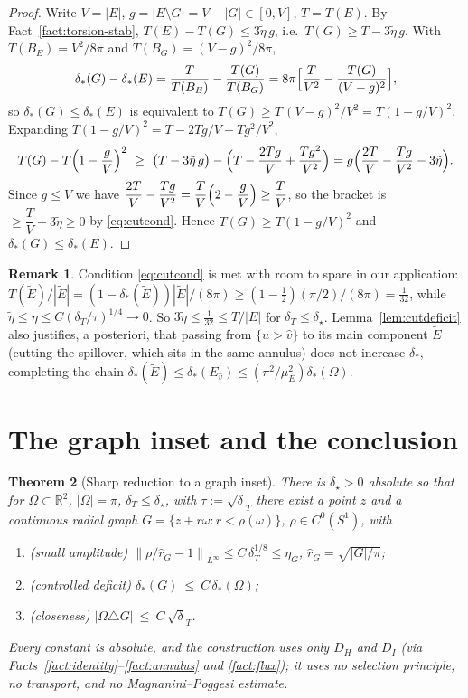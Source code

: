 \documentclass[11pt]{article}
\newtheorem{theorem}{Theorem}
\theoremstyle{definition}
\newtheorem{remark}[theorem]{Remark}
\newcommand{\R}{\mathbb R}
\newcommand{\Om}{\Omega}
\newcommand{\dT}{\delta_T}
\newcommand{\Etil}{\widetilde E}
\newcommand{\norm}[1]{\left\|#1\right\|}
\newcommand{\abs}[1]{\left|#1\right|}
\newcommand{\dstar}{\delta_{*}}
\begin{document}
\begin{proof}
Write $V=\abs E$, $g=\abs{E\setminus G}=V-\abs G\in[0,V]$, $T=T(E)$. By
Fact~\ref{fact:torsion-stab}, $T(E)-T(G)\le3\tilde\eta\,g$, i.e.\
$T(G)\ge T-3\tilde\eta\,g$. With $T(B_E)=V^2/8\pi$ and
$T(B_G)=(V-g)^2/8\pi$,
\[
   \dstar(G)-\dstar(E)
   =\frac{T}{T(B_E)}-\frac{T(G)}{T(B_G)}
   =8\pi\Bigl[\frac{T}{V^2}-\frac{T(G)}{(V-g)^2}\Bigr],
\]
so $\dstar(G)\le\dstar(E)$ is equivalent to $T(G)\ge T\,(V-g)^2/V^2=
T(1-g/V)^2$. Expanding $T(1-g/V)^2=T-2Tg/V+Tg^2/V^2$,
\[
   T(G)-T\Bigl(1-\frac gV\Bigr)^2
   \ \ge\ \bigl(T-3\tilde\eta\,g\bigr)-\Bigl(T-\frac{2Tg}{V}+\frac{Tg^2}{V^2}\Bigr)
   = g\Bigl(\frac{2T}{V}-\frac{Tg}{V^2}-3\tilde\eta\Bigr).
\]
Since $g\le V$ we have $\dfrac{2T}{V}-\dfrac{Tg}{V^2}=\dfrac TV\Bigl(2-\dfrac
gV\Bigr)\ge\dfrac TV$, so the bracket is $\ge\dfrac TV-3\tilde\eta\ge0$ by
\eqref{eq:cutcond}. Hence $T(G)\ge T(1-g/V)^2$ and $\dstar(G)\le\dstar(E)$.
\end{proof}

\begin{remark}
Condition \eqref{eq:cutcond} is met with room to spare in our application:
$T(\Etil)/\abs\Etil=(1-\dstar(\Etil))\abs\Etil/(8\pi)\ge(1-\tfrac12)
(\pi/2)/(8\pi)=\tfrac1{32}$, while $\tilde\eta\le\eta\le C(\dT/\tau)^{1/4}
\to0$. So $3\tilde\eta\le\tfrac1{32}\le T/\abs E$ for $\dT\le\delta_\star$.
Lemma~\ref{lem:cutdeficit} also justifies, a posteriori, that passing from
$\{u>\hat v\}$ to its main component $\Etil$ (cutting the spillover, which
sits in the same annulus) does not increase $\dstar$, completing the chain
$\dstar(\Etil)\le\dstar(E_{\hat v})\le(\pi^2/\mu_E^2)\dstar(\Om)$.
\end{remark}

\section{The graph inset and the conclusion}
\label{sec:concl}

\begin{theorem}[Sharp reduction to a graph inset]\label{thm:reduction}
There is $\delta_\star>0$ absolute so that for $\Om\subset\R^2$,
$\abs\Om=\pi$, $\dT\le\delta_\star$, with $\tau:=\sqrt\dT$ there exist a
point $z$ and a continuous radial graph
$G=\{z+r\omega:r<\rho(\omega)\}$, $\rho\in C^0(S^1)$, with
\begin{enumerate}[label=\textup{(\roman*)},leftmargin=2.4em]
\item \textup{(small amplitude)}
   $\norm{\rho/\hat r_G-1}_{L^\infty}\le C\,\dT^{1/8}\le\eta_G$,
   $\hat r_G=\sqrt{\abs G/\pi}$;
\item \textup{(controlled deficit)} $\dstar(G)\ \le\ C\,\dstar(\Om)$;
\item \textup{(closeness)} $\abs{\Om\triangle G}\ \le\ C\,\sqrt\dT$.
\end{enumerate}
Every constant is absolute, and the construction uses only $D_H$ and $D_I$
(via Facts~\ref{fact:identity}--\ref{fact:annulus} and \ref{fact:flux}); it
uses no selection principle, no transport, and no Magnanini--Poggesi
estimate.
\end{theorem}
\end{document}
